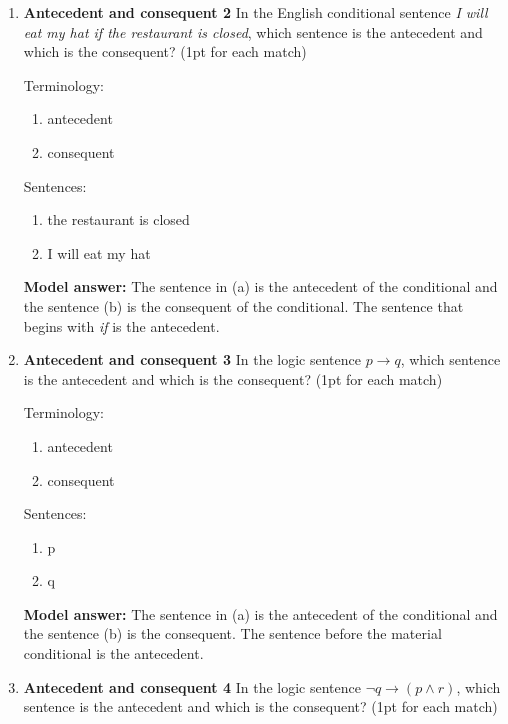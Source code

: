 \documentclass[a4,11pt]{article}
\newcommand{\6}{\mbox{$[\hspace*{-.6mm}[$}}
\newcommand{\9}{\mbox{$]\hspace*{-.6mm}]$}}
\begin{document}
\begin{enumerate}[leftmargin = 12pt]
{ \bf Model answer:}  The sentence in (a) is the antecedent of the conditional and the sentence (b) is the consequent of the conditional. The sentence that begins with {\em if} is the antecedent.

\item {\bf  Antecedent and consequent 2} In the English conditional sentence {\em I will eat my hat if the restaurant is closed}, which sentence is the antecedent and which is the consequent? (1pt for each match)

Terminology:

\begin{enumerate}
\item antecedent
\item consequent
\end{enumerate}

Sentences:


\begin{enumerate}
\item the restaurant is closed
\item I will eat my hat
\end{enumerate}

{ \bf Model answer:}  The sentence in (a) is the antecedent of the conditional and the sentence (b) is the consequent of the conditional. The sentence that begins with {\em if} is the antecedent.

\item {\bf  Antecedent and consequent 3} In the logic sentence $p \rightarrow q$, which sentence is the antecedent and which is the consequent? (1pt for each match)

Terminology:

\begin{enumerate}
\item antecedent
\item consequent
\end{enumerate}

Sentences:

\begin{enumerate}
\item p
\item q
\end{enumerate}

{ \bf Model answer:}  The sentence in (a) is the antecedent of the conditional and the sentence (b) is the consequent. The sentence before the material conditional  is the antecedent.

\item {\bf  Antecedent and consequent 4} In the logic sentence $\neg q \rightarrow (p \wedge r)$, which sentence is the antecedent and which is the consequent? (1pt for each match)


\end{enumerate}
\end{document}
